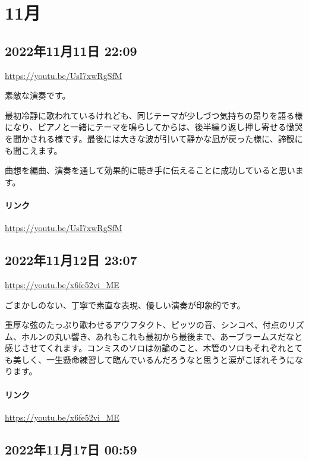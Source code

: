 \section{11月}

\subsection*{2022年11月11日 22:09}

\url{https://youtu.be/UsI7xwRgSfM}

素敵な演奏です。

最初冷静に歌われているけれども、同じテーマが少しづつ気持ちの昂りを語る様になり、ピアノと一緒にテーマを鳴らしてからは、後半繰り返し押し寄せる慟哭を聞かされる様です。最後には大きな波が引いて静かな凪が戻った様に、諦観にも聞こえます。

曲想を編曲、演奏を通して効果的に聴き手に伝えることに成功していると思います。

\paragraph{リンク}
\url{https://youtu.be/UsI7xwRgSfM}

\subsection*{2022年11月12日 23:07}

\url{https://youtu.be/x6fe52vi_ME}

ごまかしのない、丁寧で素直な表現、優しい演奏が印象的です。

重厚な弦のたっぷり歌わせるアウフタクト、ピッツの音、シンコペ、付点のリズム、ホルンの丸い響き、あれもこれも最初から最後まで、あーブラームスだなと感じさせてくれます。コンミスのソロは勿論のこと、木管のソロもそれぞれとても美しく、一生懸命練習して臨んでいるんだろうなと思うと涙がこぼれそうになります。

\paragraph{リンク}
\url{https://youtu.be/x6fe52vi_ME}

\subsection*{2022年11月17日 00:59}

